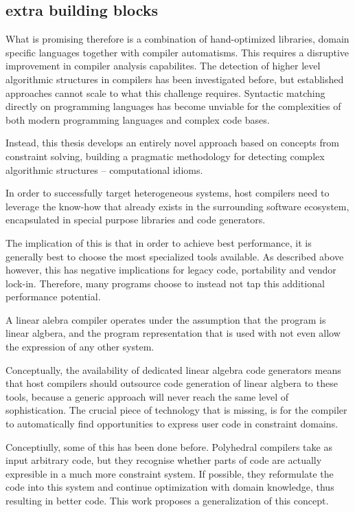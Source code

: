     \subsection*{extra building blocks}

    What is promising therefore is a combination of hand-optimized libraries,
    domain specific languages together with compiler automatisms.
    This requires a disruptive improvement in compiler analysis capabilites.
    The detection of higher level algorithmic structures in compilers has been
    investigated before, but established approaches cannot scale to what
    this challenge requires.
    Syntactic matching directly on programming languages has become
    unviable for the complexities of both modern programming languages and
    complex code bases.

    Instead, this thesis develops an entirely novel approach based on concepts
    from constraint solving, building a pragmatic methodology for detecting
    complex algorithmic structures -- computational idioms.


    In order to successfully target heterogeneous systems, host compilers need
    to leverage the know-how that already exists in the surrounding software
    ecosystem, encapsulated in special purpose libraries and code generators.

    The implication of this is that in order to achieve best performance, it is
    generally best to choose the most specialized tools available.
    As described above however, this has negative implications for legacy code,
    portability and vendor lock-in.
    Therefore, many programs choose to instead not tap this additional
    performance potential.

    A linear alebra compiler operates under the assumption that the program is
    linear algbera, and the program representation that is used with not even
    allow the expression of any other system.

    Conceptually, the availability of dedicated linear algebra code generators
    means that host compilers should outsource code generation of linear algbera
    to these tools, because a generic approach will never reach the same level
    of sophistication.
    The crucial piece of technology that is missing, is for the compiler to
    automatically find opportunities to express user code in constraint
    domains.

    Conceptiully, some of this has been done before.
    Polyhedral compilers take as input arbitrary code, but they recognise whether
    parts of code are actually expresible in a much more constraint system.
    If possible, they reformulate the code into this system and continue
    optimization with domain knowledge, thus resulting in better code.
    This work proposes a generalization of this concept.

